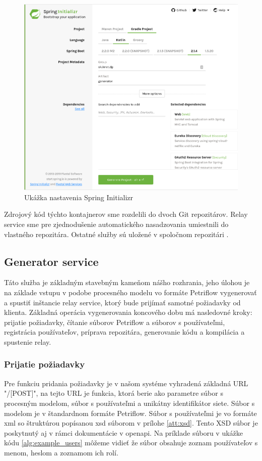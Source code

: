  \begin{figure}[!htbp]
	\centering
	\includegraphics[width=16cm]{img/initializr.png}
	\caption{Ukážka nastavenia Spring Initializr}
	\label{initializr}
\end{figure}

Zdrojový kód týchto kontajnerov sme rozdelili do dvoch Git repozitárov. Relay service sme pre zjednodušenie automatického nasadzovania umiestnili do vlastného repozitára\cite{dp_relay}. Ostatné služby sú uložené v spoločnom repozitári \cite{dp_repo}. 



\subsection{Generator service}
Táto služba je základným stavebným kameňom nášho rozhrania, jeho úlohou je na základe vstupu v podobe procesného modelu vo formáte Petriflow vygenerovať a spustiť inštancie relay service, ktorý bude prijímať samotné požiadavky od klienta. Základná operácia vygenerovania koncového dobu má nasledovné kroky:
prijatie požiadavky,
čítanie súborov Petriflow a súborov s používateľmi,
registrácia používateľov,
príprava repozitára,
generovanie kódu
a kompilácia a spustenie relay.

\subsubsection{Prijatie požiadavky}
Pre funkciu pridania požiadavky je v našom systéme vyhradená základná URL "/[POST]", na tejto URL je funkcia, ktorá berie ako parametre súbor s procesným modelom, súbor s používateľmi a unikátny identifikátor siete. Súbor s modelom je v štandardnom formáte Petriflow. Súbor s používateľmi je vo formáte \acrshort{xml} so štruktúrou popísanou \acrshort{xsd} súborom v prílohe \ref{att:xsd}. Tento XSD súbor je poskytnutý aj v rámci dokumentácie v \acrshort{openapi}. Na príklade súboru v ukážke kódu \ref{alg:example_users} môžeme vidieť že súbor obsahuje zoznam používateľov s menom, heslom a zoznamom ich rolí.

